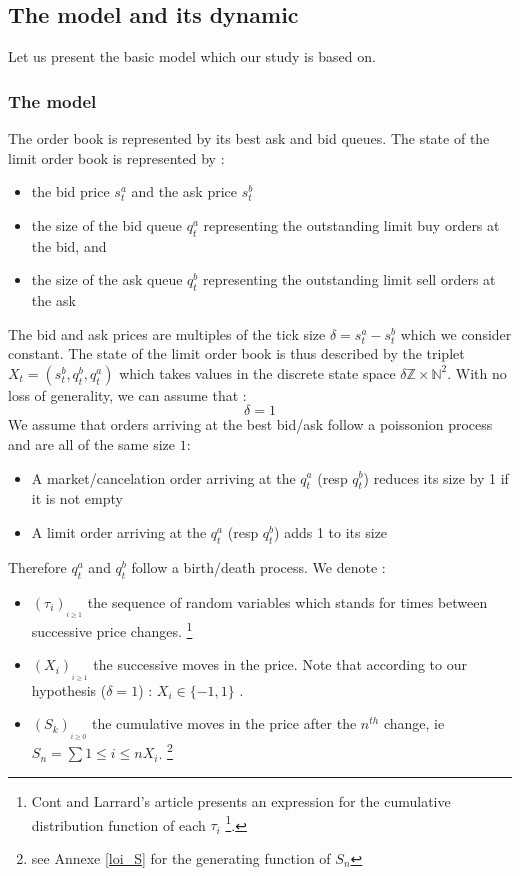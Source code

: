 \documentclass{article}
\begin{document}
\subsection{The model and its dynamic}
Let us present the basic model which our study is based on.

\subsubsection{The model}
The order book is represented by its best ask and bid queues. The state of the limit order book is represented by :
\begin{itemize}
\item the bid price $ s_{t}^{a} $ and the ask price $ s_{t}^{b} $ 
\item the size of the bid queue $ q_{t}^{a} $ representing the outstanding limit buy orders at the bid, and 
\item the size of the ask queue $ q_{t}^{b} $ representing the outstanding limit sell orders at the ask 
\end{itemize}
The bid and ask prices are multiples of the tick size $\delta = s_{t}^{a} - s_{t}^{b}$ which we consider constant.
The state of the limit order book is thus described by the triplet $X_{t} = (s_{t}^{b}, q_{t}^{b}, q_{t}^{a})$ which takes values in the discrete state space $\delta \mathbb{Z} \times \mathbb{N}^{2} $. With no loss of generality, we can assume that  :
\begin{equation}
\delta = 1
\end{equation}
We assume that orders arriving at the best bid/ask follow a poissonion process and are all of the same size $1$:
\begin{itemize}
	\item A market/cancelation order arriving at the $q_t^a$ (resp $q_t^b$) reduces its size by 1 if it is not empty
	\item A limit order arriving at the $q_t^a$ (resp $q_t^b$) adds 1 to its size 
\end{itemize}
Therefore $q_t^a$ and $q_t^b$ follow a birth/death process.
We denote :
\begin{itemize}
\item $(\tau_i)_{_{i \geq 1}}$ the sequence of random variables  which stands for times between successive price changes. \footnote { Cont and Larrard's article presents an expression for the cumulative distribution function of each $\tau_i$ \footnote{See equations (3)-(4) of Cont and Larrard's article}. }
\item $(X_i)_{_{i \geq 1}}$ the successive moves in the price. Note that according to our hypothesis ($\delta = 1$) : $X_i \in \{-1,1\}$ .
\item $(S_k)_{_{i \geq 0}}$ the cumulative moves in the price after the $n^{th}$ change, ie $S_n = \sum{1 \leq i \leq n } X_i$. \footnote{ see Annexe \ref{loi_S} for the generating function of $S_n$ }  
\end{itemize}
\end{document}
